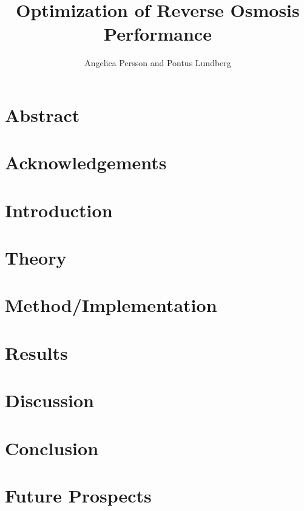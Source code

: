 \documentclass{LTHthesis}
\begin{document}
\begin{titlepages}
\author{Angelica Persson and Pontus Lundberg}
\title{Optimization of Reverse Osmosis Performance}
\end{titlepages}
\chapter{Abstract}

\chapter{Acknowledgements}


\tableofcontents



\chapter{Introduction}


\chapter{Theory}



\chapter{Method/Implementation}


\chapter{Results}


\chapter{Discussion}


\chapter{Conclusion}


\chapter{Future Prospects}

\end{document}
